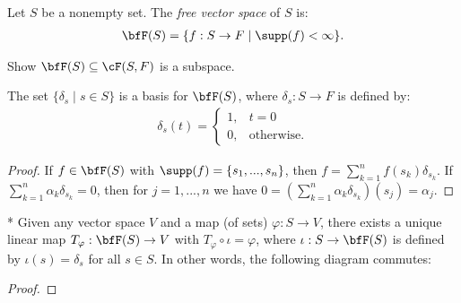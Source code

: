     \begin{definition}
        Let $S$ be a nonempty set. The \textit{free vector space} of $S$ is:
            \begin{equation*}
            \begin{split}
                \bfF(S) = \{f:S \rightarrow F \mid \supp(f) <\infty \}.
            \end{split}
            \end{equation*}
    \end{definition}

    \begin{exercise}
        Show $\bfF(S) \subseteq \cF(S,F)$ is a subspace.
    \end{exercise}

    \begin{proposition}
        The set $\{\delta_s \mid s \in S\}$ is a basis for $\bfF(S)$, where $\delta_s :S \rightarrow F$ is defined by:
            \begin{equation*}
            \begin{split}
                \delta_s(t) = \begin{cases}1, & t =0 \\ 0, & \text{otherwise.} \end{cases}
            \end{split}
            \end{equation*}
    \end{proposition}
        \begin{proof}
            If $f \in \bfF(S)$ with $\supp(f) = \{s_1,...,s_n\}$, then $f = \sum_{k =1}^n f(s_k)\delta_{s_k}$. If \newline$\sum_{k = 1}^n \alpha_k \delta_{s_k} = 0$, then for $j = 1,...,n$ we have $0 = \left( \sum_{k  =1}^n \alpha_k \delta_{s_k} \right)(s_j) = \alpha_j$.
        \end{proof}

    \begin{theorem}*
        Given any vector space $V$ and a map (of sets) $\varphi:S \rightarrow V$, there exists a unique linear map $T_\varphi : \bfF(S) \rightarrow V$ with $T_\varphi \circ \iota = \varphi$, where $\iota:S \rightarrow \bfF(S)$ is defined by $\iota(s) = \delta_s$ for all $s \in S$. In other words, the following diagram commutes:
            \begin{center}
            \end{center}
    \end{theorem}
        \begin{proof}

        \end{proof}

